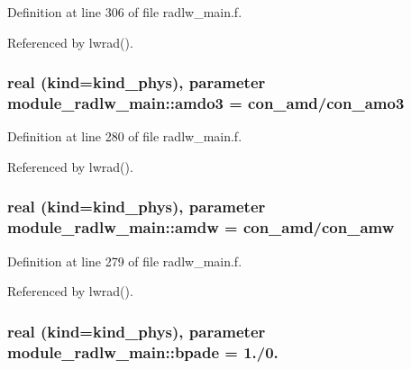 Definition at line 306 of file radlw\+\_\+main.\+f.



Referenced by lwrad().

\subsubsection[{\texorpdfstring{amdo3}{amdo3}}]{\setlength{\rightskip}{0pt plus 5cm}real (kind=kind\+\_\+phys), parameter module\+\_\+radlw\+\_\+main\+::amdo3 = con\+\_\+amd/con\+\_\+amo3\hspace{0.3cm}{\ttfamily [private]}}\hypertarget{namespacemodule__radlw__main_a06f62c34722a3d7dcec9b5643d78f039}{}\label{namespacemodule__radlw__main_a06f62c34722a3d7dcec9b5643d78f039}


Definition at line 280 of file radlw\+\_\+main.\+f.



Referenced by lwrad().

\subsubsection[{\texorpdfstring{amdw}{amdw}}]{\setlength{\rightskip}{0pt plus 5cm}real (kind=kind\+\_\+phys), parameter module\+\_\+radlw\+\_\+main\+::amdw = con\+\_\+amd/con\+\_\+amw\hspace{0.3cm}{\ttfamily [private]}}\hypertarget{namespacemodule__radlw__main_a9845c3a6eaa014e6a310fe1436162e37}{}\label{namespacemodule__radlw__main_a9845c3a6eaa014e6a310fe1436162e37}


Definition at line 279 of file radlw\+\_\+main.\+f.



Referenced by lwrad().

\subsubsection[{\texorpdfstring{bpade}{bpade}}]{\setlength{\rightskip}{0pt plus 5cm}real (kind=kind\+\_\+phys), parameter module\+\_\+radlw\+\_\+main\+::bpade = 1./0.\hspace{0.3cm}{\ttfamily [private]}}\hypertarget{namespacemodule__radlw__main_a5c63b9836ad5735dd3d0811ff527c41c}{}\label{namespacemodule__radlw__main_a5c63b9836ad5735dd3d0811ff527c41c}


